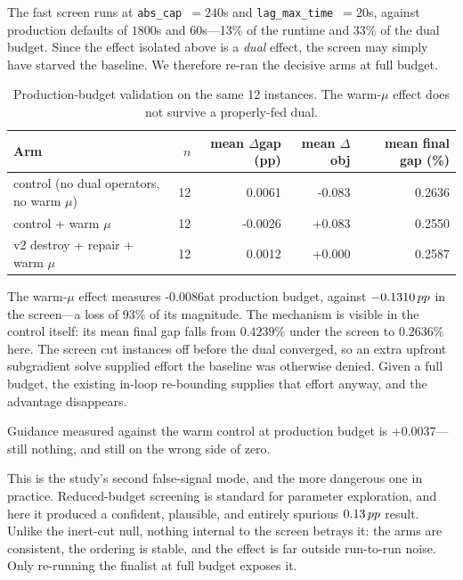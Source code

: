 The fast screen runs at \texttt{abs\_cap}~$=240$s and \texttt{lag\_max\_time}~$=20$s, against production defaults of $1800$s and $60$s---13\% of the runtime and 33\% of the dual budget. Since the effect isolated above is a \emph{dual} effect, the screen may simply have starved the baseline. We therefore re-ran the decisive arms at full budget.

\begin{table}[htbp]
\centering
\caption{Production-budget validation on the same 12 instances. The warm-$\mu$ effect does not survive a properly-fed dual.}
\label{tab:prod}
\begin{tabular}{lrrrr}
\toprule
Arm & $n$ & mean $\Delta$gap (pp) & mean $\Delta$obj & mean final gap (\%) \\
\midrule
control (no dual operators, no warm $\mu$) & 12 & 0.0061 & -0.083 & 0.2636 \\
control + warm $\mu$ & 12 & -0.0026 & +0.083 & 0.2550 \\
v2 destroy + repair + warm $\mu$ & 12 & 0.0012 & +0.000 & 0.2587 \\
\bottomrule
\end{tabular}
\end{table}

The warm-$\mu$ effect measures -0.0086\pp at production budget, against $-0.1310\,pp$ in the screen---a loss of 93\% of its magnitude. The mechanism is visible in the control itself: its mean final gap falls from $0.4239\%$ under the screen to 0.2636\% here. The screen cut instances off before the dual converged, so an extra upfront subgradient solve supplied effort the baseline was otherwise denied. Given a full budget, the existing in-loop re-bounding supplies that effort anyway, and the advantage disappears.

Guidance measured against the warm control at production budget is +0.0037\pp---still nothing, and still on the wrong side of zero.

This is the study's second false-signal mode, and the more dangerous one in practice. Reduced-budget screening is standard for parameter exploration, and here it produced a confident, plausible, and entirely spurious $0.13\,pp$ result. Unlike the inert-cut null, nothing internal to the screen betrays it: the arms are consistent, the ordering is stable, and the effect is far outside run-to-run noise. Only re-running the finalist at full budget exposes it.
